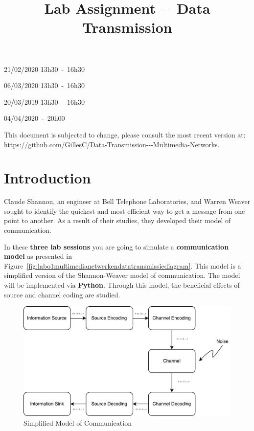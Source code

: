 \documentclass[12pt,a4paper]{article}
\title{Lab Assignment --\ Data Transmission\\\vspace{0.5cm}{\Large Multimedia Networks}}
\author{\authorName}
\newcommand{\dateSessionOne}{21/02/2020 13h30\ -\ 16h30}
\newcommand{\dateSessionTwo}{06/03/2020 13h30\ -\ 16h30}
\newcommand{\dateSessionThree}{20/03/2019 13h30\ -\ 16h30}
\newcommand{\softDeadline}{04/04/2020\ -\ 20h00}
\begin{document}
\maketitle
\vfill


\begin{center}

  \begin{minipage}{0.65\linewidth}
\begin{description}[style=multiline, leftmargin=4cm]
	\item[Lab session 1] \dateSessionOne
	\item[Lab session 2] \dateSessionTwo
	\item[Lab session 3] \dateSessionThree
\end{description}
\vfill
\begin{description}[style=multiline, leftmargin=4cm]
	\item[Deadline] \softDeadline
\end{description}
\vfill
{\footnotesize
This document is subjected to change, please consult the most recent version at: \url{https://github.com/GillesC/Data-Transmission---Multimedia-Networks}.
}
\end{minipage}
\end{center}

\vfill
\clearpage


\section{Introduction}
Claude Shannon, an engineer at Bell Telephone Laboratories, and Warren Weaver sought to identify the quickest and most efficient way to get a message from one point to another. As a result of their studies, they developed their model of communication.

In these \textbf{three lab sessions} you are going to simulate a \textbf{communication model} as presented in Figure~\vref{fig:labo1multimedianetwerkendatatransmissiediagram}. This model is a simplified version of the Shannon-Weaver model of communication. The model will be implemented via \textbf{Python}. Through this model, the beneficial effects of source and channel coding are studied. 

\begin{figure}[h]
	\centering
	\includegraphics[width=0.7\linewidth]{labo_1_multimedianetwerken_datatransmissie_diagram.pdf}
	\caption{Simplified Model of Communication}\label{fig:labo1multimedianetwerkendatatransmissiediagram}
\end{figure}
\end{document}
